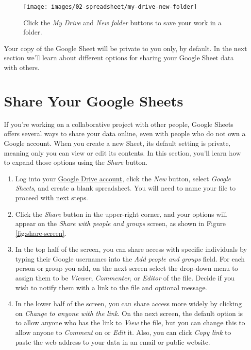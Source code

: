 \documentclass[
  english,
]{book}
\begin{document}
\begin{figure}
\texttt{[image: images/02-spreadsheet/my-drive-new-folder]} \caption{Click the \emph{My Drive} and \emph{New folder} buttons to save your work in a folder.}\label{fig:my-drive-new-folder}
\end{figure}

Your copy of the Google Sheet will be private to you only, by default. In the next section we'll learn about different options for sharing your Google Sheet data with others.

\hypertarget{share}{%
\section*{Share Your Google Sheets}\label{share}}

If you're working on a collaborative project with other people, Google Sheets offers several ways to share your data online, even with people who do not own a Google account. When you create a new Sheet, its default setting is private, meaning only you can view or edit its contents. In this section, you'll learn how to expand those options using the \emph{Share} button.

\begin{enumerate}
\def\labelenumi{\arabic{enumi}.}
\item
  Log into your \href{https://drive.google.com}{Google Drive account}, click the \emph{New} button, select \emph{Google Sheets}, and create a blank spreadsheet. You will need to name your file to proceed with next steps.
\item
  Click the \emph{Share} button in the upper-right corner, and your options will appear on the \emph{Share with people and groups} screen, as shown in Figure \ref{fig:share-screen}.
\item
  In the top half of the screen, you can share access with specific individuals by typing their Google usernames into the \emph{Add people and groups} field. For each person or group you add, on the next screen select the drop-down menu to assign them to be \emph{Viewer}, \emph{Commenter}, or \emph{Editor} of the file. Decide if you wish to notify them with a link to the file and optional message.
\item
  In the lower half of the screen, you can share access more widely by clicking on \emph{Change to anyone with the link}. On the next screen, the default option is to allow anyone who has the link to \emph{View} the file, but you can change this to allow anyone to \emph{Comment} on or \emph{Edit} it. Also, you can click \emph{Copy link} to paste the web address to your data in an email or public website.
\end{enumerate}
\end{document}
